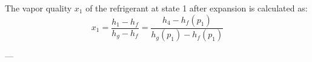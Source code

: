 The vapor quality \( x_1 \) of the refrigerant at state 1 after expansion is calculated as:  
\[
x_1 = \frac{h_1 - h_f}{h_g - h_f} = \frac{h_4 - h_f(p_1)}{h_g(p_1) - h_f(p_1)}
\]

---